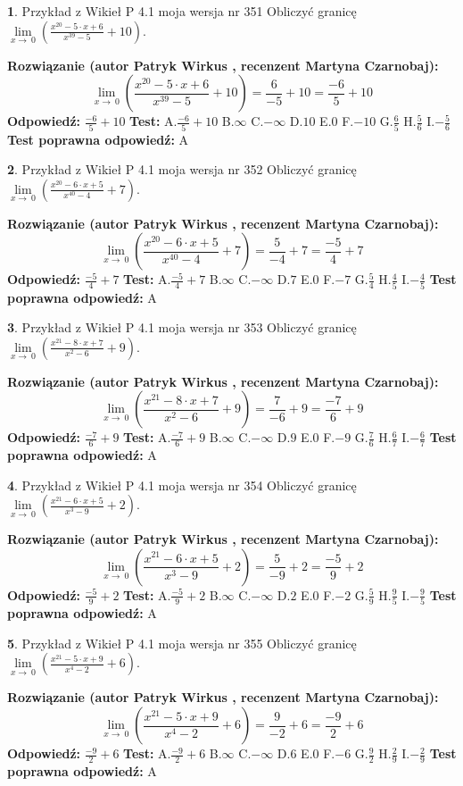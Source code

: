 \documentclass[12pt, a4paper]{article}
\theoremstyle{definition} %
\newtheorem{zad}{}
\newcommand{\zadStart}[1]{\begin{zad}#1\newline}
\newcommand{\zadStop}{\end{zad}}
\newcommand{\rozwStart}[2]{\noindent \textbf{Rozwiązanie (autor #1 , recenzent #2): }\newline}
\newcommand{\rozwStop}{\newline}
\newcommand{\odpStart}{\noindent \textbf{Odpowiedź:}\newline}
\newcommand{\odpStop}{\newline}
\newcommand{\testStart}{\noindent \textbf{Test:}\newline}
\newcommand{\testStop}{\newline}
\newcommand{\kluczStart}{\noindent \textbf{Test poprawna odpowiedź:}\newline}
\newcommand{\kluczStop}{\newline}
\begin{document}
\zadStart{Przykład z Wikieł P 4.1 moja wersja nr 351}
Obliczyć granicę $\lim\limits_{x\to\ 0}(\frac{x^{20}-5 \cdot x +6}{x^{39}-5}+10)$.
\zadStop
\rozwStart{Patryk Wirkus}{Martyna Czarnobaj}
$$\lim\limits_{x\to\ 0}(\frac{x^{20}-5 \cdot x +6}{x^{39}-5}+10)=\frac{6}{-5}+10=\frac{-6}{5}+10$$
\rozwStop
\odpStart
$\frac{-6}{5}+10$
\odpStop
\testStart
A.$\frac{-6}{5}+10$
B.$\infty$
C.$-\infty$
D.$10$
E.$0$
F.$-10$
G.$\frac{6}{5}$
H.$\frac{5}{6}$
I.$-\frac{5}{6}$
\testStop
\kluczStart
A
\kluczStop



\zadStart{Przykład z Wikieł P 4.1 moja wersja nr 352}
Obliczyć granicę $\lim\limits_{x\to\ 0}(\frac{x^{20}-6 \cdot x +5}{x^{40}-4}+7)$.
\zadStop
\rozwStart{Patryk Wirkus}{Martyna Czarnobaj}
$$\lim\limits_{x\to\ 0}(\frac{x^{20}-6 \cdot x +5}{x^{40}-4}+7)=\frac{5}{-4}+7=\frac{-5}{4}+7$$
\rozwStop
\odpStart
$\frac{-5}{4}+7$
\odpStop
\testStart
A.$\frac{-5}{4}+7$
B.$\infty$
C.$-\infty$
D.$7$
E.$0$
F.$-7$
G.$\frac{5}{4}$
H.$\frac{4}{5}$
I.$-\frac{4}{5}$
\testStop
\kluczStart
A
\kluczStop



\zadStart{Przykład z Wikieł P 4.1 moja wersja nr 353}
Obliczyć granicę $\lim\limits_{x\to\ 0}(\frac{x^{21}-8 \cdot x +7}{x^{2}-6}+9)$.
\zadStop
\rozwStart{Patryk Wirkus}{Martyna Czarnobaj}
$$\lim\limits_{x\to\ 0}(\frac{x^{21}-8 \cdot x +7}{x^{2}-6}+9)=\frac{7}{-6}+9=\frac{-7}{6}+9$$
\rozwStop
\odpStart
$\frac{-7}{6}+9$
\odpStop
\testStart
A.$\frac{-7}{6}+9$
B.$\infty$
C.$-\infty$
D.$9$
E.$0$
F.$-9$
G.$\frac{7}{6}$
H.$\frac{6}{7}$
I.$-\frac{6}{7}$
\testStop
\kluczStart
A
\kluczStop



\zadStart{Przykład z Wikieł P 4.1 moja wersja nr 354}
Obliczyć granicę $\lim\limits_{x\to\ 0}(\frac{x^{21}-6 \cdot x +5}{x^{3}-9}+2)$.
\zadStop
\rozwStart{Patryk Wirkus}{Martyna Czarnobaj}
$$\lim\limits_{x\to\ 0}(\frac{x^{21}-6 \cdot x +5}{x^{3}-9}+2)=\frac{5}{-9}+2=\frac{-5}{9}+2$$
\rozwStop
\odpStart
$\frac{-5}{9}+2$
\odpStop
\testStart
A.$\frac{-5}{9}+2$
B.$\infty$
C.$-\infty$
D.$2$
E.$0$
F.$-2$
G.$\frac{5}{9}$
H.$\frac{9}{5}$
I.$-\frac{9}{5}$
\testStop
\kluczStart
A
\kluczStop



\zadStart{Przykład z Wikieł P 4.1 moja wersja nr 355}
Obliczyć granicę $\lim\limits_{x\to\ 0}(\frac{x^{21}-5 \cdot x +9}{x^{4}-2}+6)$.
\zadStop
\rozwStart{Patryk Wirkus}{Martyna Czarnobaj}
$$\lim\limits_{x\to\ 0}(\frac{x^{21}-5 \cdot x +9}{x^{4}-2}+6)=\frac{9}{-2}+6=\frac{-9}{2}+6$$
\rozwStop
\odpStart
$\frac{-9}{2}+6$
\odpStop
\testStart
A.$\frac{-9}{2}+6$
B.$\infty$
C.$-\infty$
D.$6$
E.$0$
F.$-6$
G.$\frac{9}{2}$
H.$\frac{2}{9}$
I.$-\frac{2}{9}$
\testStop
\kluczStart
A
\kluczStop
\end{document}
